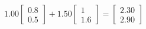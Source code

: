 \documentclass[preview]{standalone}
\begin{document}
\begin{align*}
1.00 \begin{bmatrix} 0.8 \\ 0.5 \end{bmatrix} + 1.50 \begin{bmatrix} 1 \\ 1.6 \end{bmatrix} = \begin{bmatrix} 2.30 \\ 2.90 \end{bmatrix}
\end{align*}
\end{document}
